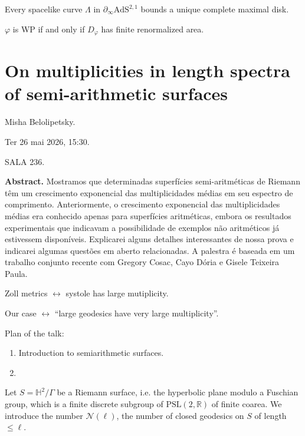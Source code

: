 \begin{theorem}
\label{theorem-lab-tou-wol}
Every spacelike curve $\Lambda$
in $\partial_{\infty}\text{AdS}^{2,1}$
bounds a unique complete maximal disk.
\end{theorem}

\begin{theorem}[Graham-et al.]
\label{theorem-graham-teich}
$\varphi$ is WP if and only if
$D_\varphi$ has finite renormalized area.
\end{theorem}

\section{On multiplicities in length spectra of semi-arithmetic surfaces}
\label{section-multiplicities-length-spectra-semi-arithmetic-surfaces}

\noindent
Misha Belolipetsky.

Ter 26 mai 2026, 15:30.

SALA 236.

\medskip\noindent 
{\bf Abstract.} Mostramos
que determinadas superfícies semi-aritméticas
de Riemann têm um crescimento exponencial das
multiplicidades médias em seu espectro de
comprimento. Anteriormente, o crescimento
exponencial das multiplicidades médias era
conhecido apenas para superfícies
aritméticas, embora os resultados
experimentais que indicavam a possibilidade
de exemplos não aritméticos já estivessem
disponíveis. Explicarei alguns detalhes
interessantes de nossa prova e indicarei
algumas questões em aberto relacionadas. A
palestra é baseada em um trabalho conjunto
recente com Gregory Cosac, Cayo Dória e
Gisele Teixeira Paula.

\medskip\noindent
Zoll metrics $\leftrightarrow$
systole has large mutiplicity.

\medskip\noindent
Our case $\leftrightarrow$
``large geodesics have
very large multiplicity''.

\medskip\noindent
Plan of the talk:
\begin{enumerate}
\item Introduction to semiarithmetic
surfaces.
\item 
\end{enumerate}


\medskip\noindent
Let $S=\mathbb{H}^2/\Gamma$
be a Riemann surface, i.e.
the hyperbolic plane modulo a 
Fuschian group, which is a finite discrete
subgroup of $\text{PSL}(2,\mathbb{R})$
of finite coarea.
We introduce the number $\mathcal{N}(\ell)$,
the number of closed geodesics on $S$
of length $\leq \ell$.

